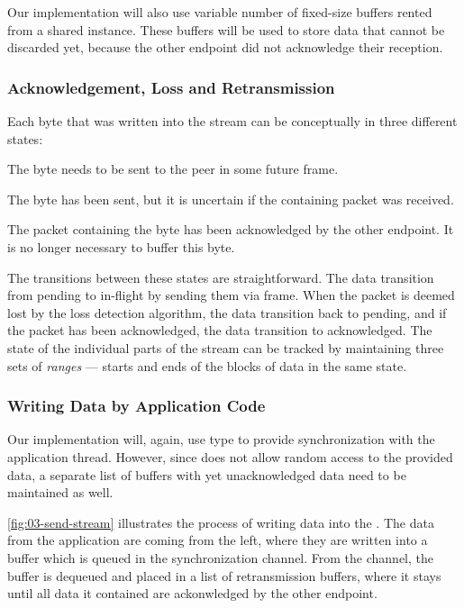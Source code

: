 Our implementation will also use variable number of fixed-size buffers rented from a shared
 instance. These buffers will be used to store data that cannot be discarded
yet, because the other endpoint did not acknowledge their reception.

\subsubsection{Acknowledgement, Loss and Retransmission}

Each byte that was written into the stream can be conceptually in three different states:

\begin{itemize}

   The byte needs to be sent to the peer in some future \STREAM{} frame.

   The byte has been sent, but it is uncertain if the containing packet was
received.

   The packet containing the byte has been acknowledged by the other endpoint. It is no longer necessary to buffer this byte.

\end{itemize}

The transitions between these states are straightforward. The data transition from pending to
in-flight by sending them via \STREAM{} frame. When the packet is deemed lost by the loss detection
algorithm, the data transition back to pending, and if the packet has been acknowledged, the data
transition to acknowledged. The state of the individual parts of the stream can be tracked by
maintaining three sets of \textit{ranges} --- starts and ends of the blocks of data in the same state.

\subsubsection{Writing Data by Application Code}

Our implementation will, again, use  type to provide synchronization with the
application thread. However, since  does not allow random access to the provided
data, a separate list of buffers with yet unacknowledged data need to be maintained as well.

\autoref{fig:03-send-stream} illustrates the process of writing data into the \SendStream{}. The
data from the application are coming from the left, where they are written into a buffer which is
queued in the synchronization channel. From the channel, the buffer is dequeued and placed in a list
of retransmission buffers, where it stays until all data it contained are ackonwledged by the other
endpoint.

